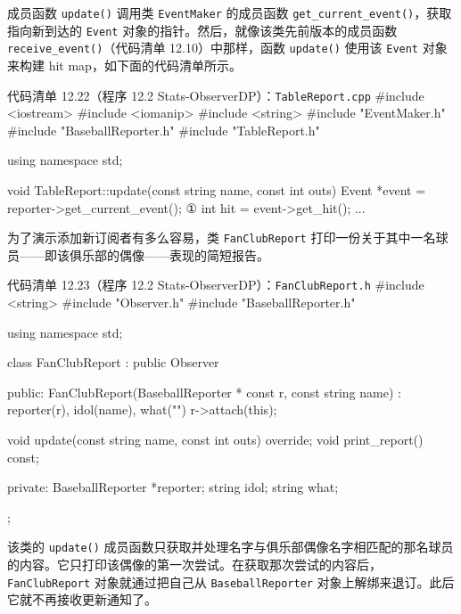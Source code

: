 成员函数 \texttt{update()} 调用类 \texttt{Event\allowbreak{}Maker} 的成员函数 \texttt{get\_\allowbreak{}current\_\allowbreak{}event(\allowbreak{})\allowbreak{}}，获取指向新到达的 \texttt{Event} 对象的指针。然后，就像该类先前版本的成员函数 \texttt{receive\_\allowbreak{}event(\allowbreak{})\allowbreak{}}（代码清单 12.10）中那样，函数 \texttt{update()} 使用该 \texttt{Event} 对象来构建 hit map，如下面的代码清单所示。

\begin{codeboxt}{代码清单 12.22（程序 12.2 Stats-ObserverDP）：\texttt{Table\allowbreak{}Report.\allowbreak{}cpp}}
#include <iostream>
#include <iomanip>
#include <string>
#include "EventMaker.h"
#include "BaseballReporter.h"
#include "TableReport.h"

using namespace std;

void TableReport::update(const string name, const int outs)
{
    Event  *event = reporter->get_current_event();       ①
    int     hit   = event->get_hit();
    ...
}
\end{codeboxt}
\par

为了演示添加新订阅者有多么容易，类 \texttt{Fan\allowbreak{}Club\allowbreak{}Report} 打印一份关于其中一名球员——即该俱乐部的偶像——表现的简短报告。

\begin{codeboxt}{代码清单 12.23（程序 12.2 Stats-ObserverDP）：\texttt{Fan\allowbreak{}Club\allowbreak{}Report.\allowbreak{}h}}
#include <string>
#include "Observer.h"
#include "BaseballReporter.h"

using namespace std;

class FanClubReport : public Observer
{
public:
    FanClubReport(BaseballReporter * const r, const string name)
        : reporter(r), idol(name), what("")
    {
        r->attach(this);
    }

    void update(const string name, const int outs) override;
    void print_report() const;

private:
    BaseballReporter *reporter;
    string idol;
    string what;
};
\end{codeboxt}

该类的 \texttt{update()} 成员函数只获取并处理名字与俱乐部偶像名字相匹配的那名球员的内容。它只打印该偶像的第一次尝试。在获取那次尝试的内容后，\texttt{Fan\allowbreak{}Club\allowbreak{}Report} 对象就通过把自己从 \texttt{Baseball\allowbreak{}Reporter} 对象上解绑来退订。此后它就不再接收更新通知了。

